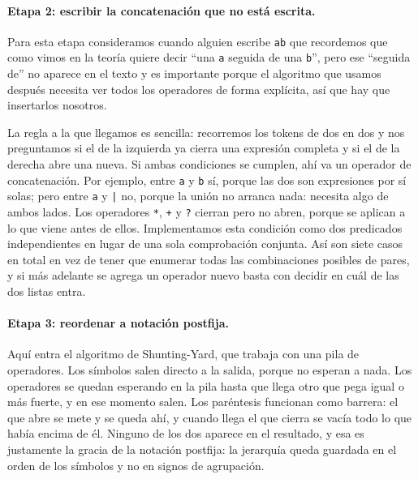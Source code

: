 \documentclass[12pt, letterpaper]{article}
\begin{document}
\paragraph{Etapa 2: escribir la concatenación que no está escrita.}

Para esta etapa consideramos cuando alguien escribe \texttt{ab} que recordemos que como vimos en la teoría quiere decir ``una \texttt{a} seguida de una
\texttt{b}'', pero ese ``seguida de'' no aparece en el texto y es importante porque el algoritmo que
usamos después necesita ver todos los operadores de forma explícita, así que
hay que insertarlos nosotros.

\noindent La regla a la que llegamos es sencilla: recorremos los tokens de dos en dos y
nos preguntamos si el de la izquierda ya cierra una expresión completa y si el
de la derecha abre una nueva. Si ambas condiciones se cumplen, ahí va un
operador de concatenación. Por ejemplo, entre \texttt{a} y \texttt{b} sí,
porque las dos son expresiones por sí solas; pero entre \texttt{a} y
\texttt{|} no, porque la unión no arranca nada: necesita algo de ambos lados.
Los operadores \texttt{*}, \texttt{+} y \texttt{?} cierran pero no abren,
porque se aplican a lo que viene antes de ellos. Implementamos esta condición como dos predicados independientes en lugar de una
sola comprobación conjunta. Así son siete casos en total en vez de tener que
enumerar todas las combinaciones posibles de pares, y si más adelante se agrega
un operador nuevo basta con decidir en cuál de las dos listas entra.

\paragraph{Etapa 3: reordenar a notación postfija.}
Aquí entra el algoritmo de Shunting-Yard, que trabaja con una pila de
operadores. Los símbolos salen directo a la salida, porque no esperan a nada.
Los operadores se quedan esperando en la pila hasta que llega otro que pega
igual o más fuerte, y en ese momento salen. Los paréntesis funcionan como
barrera: el que abre se mete y se queda ahí, y cuando llega el que cierra se
vacía todo lo que había encima de él. Ninguno de los dos aparece en el
resultado, y esa es justamente la gracia de la notación postfija: la jerarquía
queda guardada en el orden de los símbolos y no en signos de agrupación. \\
\end{document}
